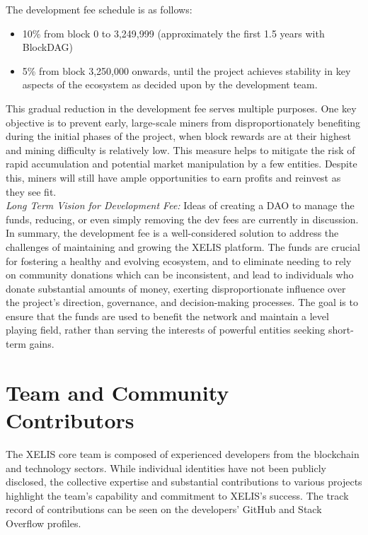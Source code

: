 \documentclass[12pt,a4paper,twocolumn]{article}
\begin{document}
The development fee schedule is as follows:

\begin{itemize}
    \item 10\% from block 0 to 3,249,999 (approximately the first 1.5 years with BlockDAG)
    \item 5\% from block 3,250,000 onwards, until the project achieves stability in key aspects of the ecosystem as decided upon by the development team. \end{itemize}
This gradual reduction in the development fee serves multiple purposes. One key objective is to prevent early, large-scale miners from disproportionately benefiting during the initial phases of the project, when block rewards are at their highest and mining difficulty is relatively low. This measure helps to mitigate the risk of rapid accumulation and potential market manipulation by a few entities. Despite this, miners will still have ample opportunities to earn profits and reinvest as they see fit.\\

\textit{Long Term Vision for Development Fee:} Ideas of creating a DAO to manage the funds, reducing, or even simply removing the dev fees are currently in discussion. \\

In summary, the development fee is a well-considered solution to address the challenges of maintaining and growing the XELIS platform. The funds are crucial for fostering a healthy and evolving ecosystem, and to eliminate needing to rely on community donations which can be inconsistent, and lead to individuals who donate substantial amounts of money, exerting disproportionate influence over the project's direction, governance, and decision-making processes. The goal is to ensure that the funds are used to benefit the network and maintain a level playing field, rather than serving the interests of powerful entities seeking short-term gains.


\section{Team and Community Contributors}

The XELIS core team is composed of experienced developers from the blockchain and technology sectors. While individual identities have not been publicly disclosed, the collective expertise and substantial contributions to various projects highlight the team's capability and commitment to XELIS's success. The track record of contributions can be seen on the developers' GitHub and Stack Overflow profiles.\\
\end{document}
